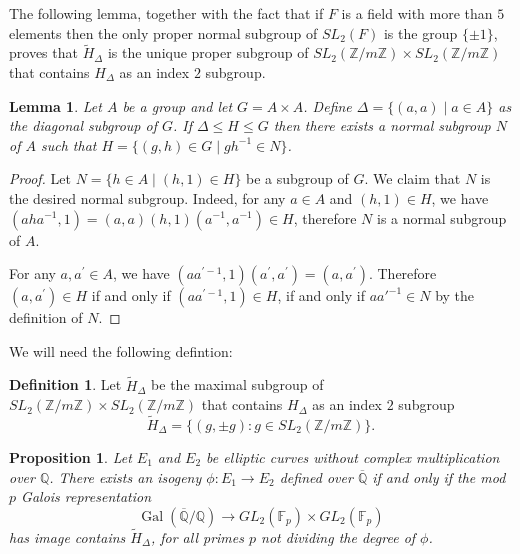 \documentclass[12pt]{amsart}
\newtheorem{prop}[thm]{Proposition}
\newtheorem{lem}[thm]{Lemma}
\theoremstyle{definition}
\newtheorem{defn}[thm]{Definition}
\theoremstyle{remark}
\numberwithin{equation}{section}
\newcommand{\F}{\mathbb{F}}
\newcommand{\Z}{\mathbb{Z}}
\newcommand{\Q}{\mathbb{Q}}
\DeclareMathOperator{\Gal}{Gal}
\begin{document}
 
The following lemma, together with the fact that if $F$ is a field with more than $5$ elements then the only proper normal subgroup of $SL_{2}(F)$ is the group $\{\pm 1\}$, proves that $\tilde{H}_{\Delta}$ is the unique proper subgroup of $SL_{2}(\Z/m\Z) \times SL_{2}(\Z/m\Z)$ that contains $H_{\Delta}$ as an index $2$ subgroup.

\begin{lem}
Let $A$ be a group and let $G=A \times A$. Define $\Delta=\{(a,a) \mid a \in A\}$ as the diagonal subgroup of $G$. If $\Delta \le H \le G$ then there exists a normal subgroup $N$ of $A$ such that $H=\{(g,h) \in G \mid gh^{-1} \in N \}$.	
\end{lem}

\begin{proof}
	Let $N=\{h \in A \mid (h,1) \in H \}$ be a subgroup of $G$. We claim that $N$ is the desired normal subgroup. Indeed, for any $a \in A$ and $(h,1) \in H$, we have $(aha^{-1},1)=(a,a)(h,1)(a^{-1}, a^{-1}) \in H$, therefore $N$ is a normal subgroup of $A$.
	
	For any $a, a^{\prime} \in A$, we have $(aa^{\prime -1},1)(a^{\prime}, a^{\prime})=(a, a^{\prime})$. Therefore $(a, a^{\prime}) \in H$ if and only if $(aa^{\prime -1},1) \in H$, if and only if $aa'^{-1}\in N$ by the definition of $N$.
\end{proof}

We will need the following defintion:
\begin{defn}
Let $\tilde{H}_{\Delta}$ be the maximal subgroup of $SL_{2}(\Z/m\Z) \times SL_{2}(\Z/m\Z)$ that contains $H_{\Delta}$ as an index $2$ subgroup
$$\tilde{H}_\Delta=\{(g,\pm g)\colon g\in SL_2(\Z/m\Z)\}.$$
\end{defn}
\begin{prop}\label{Qbar}
	Let $E_{1}$ and $E_{2}$ be elliptic curves without complex multiplication over $\Q$. There exists an isogeny $\phi: E_{1} \to E_{2}$ defined over $\overline{\Q}$ if and only if the mod $p$ Galois representation 
	$$\Gal(\overline{\Q}/\Q) \to GL_{2}(\F_{p}) \times GL_{2}(\F_{p})$$ has image contains $\tilde{H}_{\Delta}$, for all primes $p$ not dividing the degree of $\phi$. 
\end{prop}
\end{document}
